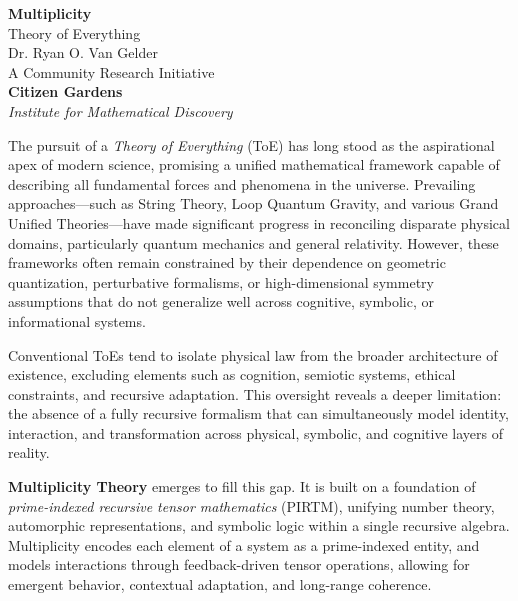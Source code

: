 \documentclass[12]{amsart}
\theoremstyle{plain}
\begin{document}
\nolinenumbers
\begin{titlepage}
    \centering

  \Huge\textbf{Multiplicity} \\
\vspace*{1em}
  \LARGE{Theory of Everything}
    \vspace{1.5cm} \\
     \Large{Dr. Ryan O. Van Gelder}
   \vspace{1.5cm} \\
     \Large{A Community Research Initiative}
  \vspace{0.5cm} \\
     {\bfseries Citizen Gardens}\\
     \vspace{0.5cm}
    \textit{Institute for Mathematical Discovery}\\
     \vspace{1cm}
    \vfill

   
    \vspace{0.5em}
    \begin{minipage}{0.85\textwidth}
        \small
The pursuit of a \textit{Theory of Everything} (ToE) has long stood as the aspirational apex of modern science, promising a unified mathematical framework capable of describing all fundamental forces and phenomena in the universe. Prevailing approaches—such as String Theory, Loop Quantum Gravity, and various Grand Unified Theories—have made significant progress in reconciling disparate physical domains, particularly quantum mechanics and general relativity. However, these frameworks often remain constrained by their dependence on geometric quantization, perturbative formalisms, or high-dimensional symmetry assumptions that do not generalize well across cognitive, symbolic, or informational systems.

Conventional ToEs tend to isolate physical law from the broader architecture of existence, excluding elements such as cognition, semiotic systems, ethical constraints, and recursive adaptation. This oversight reveals a deeper limitation: the absence of a fully recursive formalism that can simultaneously model identity, interaction, and transformation across physical, symbolic, and cognitive layers of reality.

\textbf{Multiplicity Theory} emerges to fill this gap. It is built on a foundation of \textit{prime-indexed recursive tensor mathematics} (PIRTM), unifying number theory, automorphic representations, and symbolic logic within a single recursive algebra. Multiplicity encodes each element of a system as a prime-indexed entity, and models interactions through feedback-driven tensor operations, allowing for emergent behavior, contextual adaptation, and long-range coherence.

    \end{minipage}

\end{titlepage}
\end{document}
